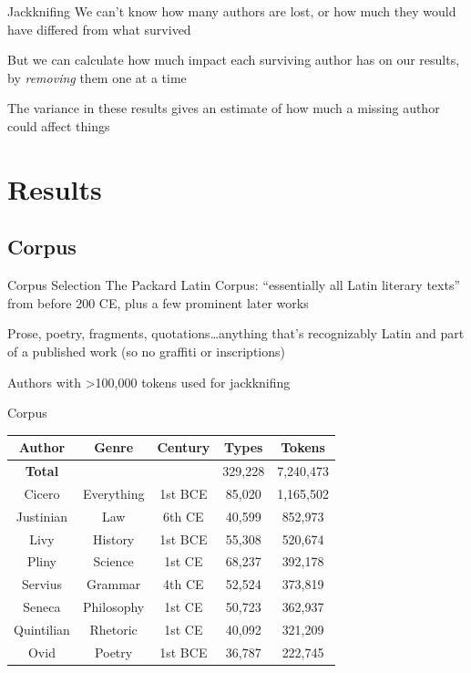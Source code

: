 \documentclass{beamer}
\begin{document}
\begin{frame}{Jackknifing}
We can't know how many authors are lost, or how much they would have differed from what survived

But we can calculate how much impact each surviving author has on our results, by \emph{removing} them one at a time

The variance in these results gives an estimate of how much a missing author could affect things
\end{frame}

\section{Results}

\subsection{Corpus}

\begin{frame}{Corpus Selection}
The Packard Latin Corpus: ``essentially all Latin literary texts'' from before 200 CE, plus a few prominent later works

Prose, poetry, fragments, quotations…anything that's recognizably Latin and part of a published work (so no graffiti or inscriptions)

Authors with >100,000 tokens used for jackknifing
\end{frame}

\begin{frame}{Corpus}
\begin{table}
\begin{tabular}{|c|c|c|c|c|}
\hline
\textbf{Author} & \textbf{Genre} & \textbf{Century} & \textbf{Types} & \textbf{Tokens} \\\hline
\textbf{Total} & & & 329,228 & 7,240,473 \\\hline\hline
Cicero & Everything & 1st BCE & 85,020 & 1,165,502 \\\hline
Justinian & Law & 6th CE & 40,599 & 852,973 \\\hline
Livy & History & 1st BCE & 55,308 & 520,674 \\\hline
Pliny & Science & 1st CE & 68,237 & 392,178 \\\hline
Servius & Grammar & 4th CE & 52,524 & 373,819 \\\hline
Seneca & Philosophy & 1st CE & 50,723 & 362,937 \\\hline
Quintilian & Rhetoric & 1st CE & 40,092 & 321,209 \\\hline
Ovid & Poetry & 1st BCE & 36,787 & 222,745 \\\hline
\end{tabular}
\end{table}
\end{frame}
\end{document}
